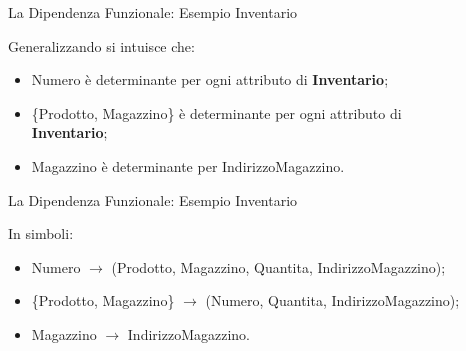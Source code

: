 %
\begin{frame}{La Dipendenza Funzionale: Esempio Inventario}
\vspace{-0.7cm}
\InventarioModified
\vspace{.2cm}

Generalizzando si intuisce che:
\begin{itemize}[<+->]
    \item Numero \`e determinante per ogni attributo di \textbf{Inventario};
    \item \{Prodotto, Magazzino\} \`e determinante per ogni attributo di\\ \textbf{Inventario};
    \item Magazzino \`e determinante per IndirizzoMagazzino.
\end{itemize}
\end{frame}
%
\begin{frame}{La Dipendenza Funzionale: Esempio Inventario}
\vspace{-0.7cm}
\InventarioModified
\vspace{.2cm}

In simboli:
\begin{itemize}[<+->]
    \item Numero $ \rightarrow $ (Prodotto, Magazzino, Quantita, IndirizzoMagazzino);
    \item \{Prodotto, Magazzino\} $ \rightarrow $ (Numero, Quantita, IndirizzoMagazzino);
    \item Magazzino $ \rightarrow $ IndirizzoMagazzino.
\end{itemize}
\end{frame}
